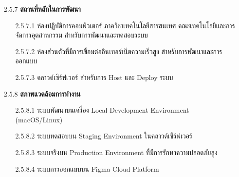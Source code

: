 \documentclass[12pt,a4paper]{article}
\begin{document}
\begin{enumerate}[leftmargin=2cm]
{        \begin{enumerate}
            \item[2.5.7] \textbf{สถานที่หลักในการพัฒนา}
            \begin{enumerate}
                \item[2.5.7.1] ห้องปฏิบัติการคอมพิวเตอร์ ภาควิชาเทคโนโลยีสารสนเทศ คณะเทคโนโลยีและการจัดการอุตสาหกรรม สำหรับการพัฒนาและทดสอบระบบ
                \item[2.5.7.2] ห้องส่วนตัวที่มีการเชื่อมต่ออินเทอร์เน็ตความเร็วสูง สำหรับการพัฒนาและการออกแบบ
                \item[2.5.7.3] คลาวด์เซิร์ฟเวอร์ สำหรับการ Host และ Deploy ระบบ
            \end{enumerate}

            \item[2.5.8] \textbf{สภาพแวดล้อมการทำงาน}
            \begin{enumerate}
                \item[2.5.8.1] ระบบพัฒนาบนเครื่อง Local Development Environment (macOS/Linux)
                \item[2.5.8.2] ระบบทดสอบบน Staging Environment ในคลาวด์เซิร์ฟเวอร์
                \item[2.5.8.3] ระบบจริงบน Production Environment ที่มีการรักษาความปลอดภัยสูง
                \item[2.5.8.4] ระบบการออกแบบบน Figma Cloud Platform
            \end{enumerate}
        \end{enumerate}
    }


\end{enumerate}
\end{document}
